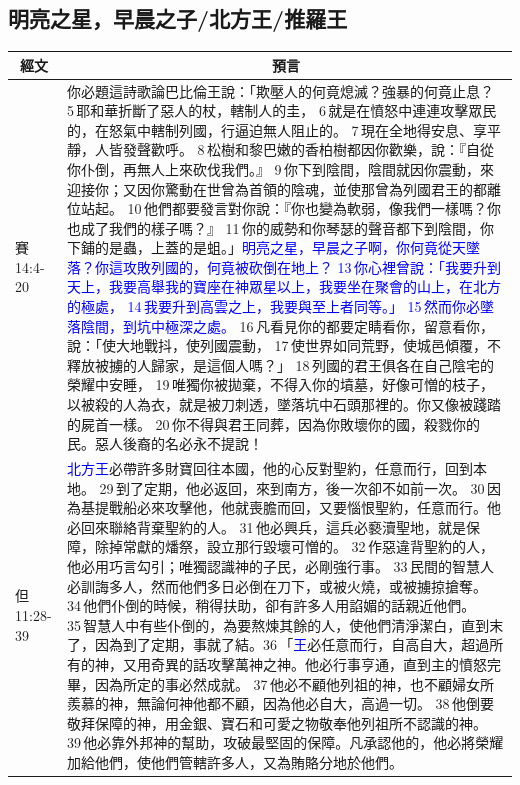 \subsection{明亮之星，早晨之子/北方王/推羅王}
\begin{table}[H]
\centering
\begin{tabular}{p{1.25cm}|p{16.25cm}}\hline\hline
\multicolumn{1}{c|}{經文}&\multicolumn{1}{c}{預言}\\\hline
賽14:4-20&你必題這詩歌論巴比倫王說：「欺壓人的何竟熄滅？強暴的何竟止息？ 5 耶和華折斷了惡人的杖，轄制人的圭， 6 就是在憤怒中連連攻擊眾民的，在怒氣中轄制列國，行逼迫無人阻止的。 7 現在全地得安息、享平靜，人皆發聲歡呼。 8 松樹和黎巴嫩的香柏樹都因你歡樂，說：『自從你仆倒，再無人上來砍伐我們。』 9 你下到陰間，陰間就因你震動，來迎接你；又因你驚動在世曾為首領的陰魂，並使那曾為列國君王的都離位站起。 10 他們都要發言對你說：『你也變為軟弱，像我們一樣嗎？你也成了我們的樣子嗎？』 11 你的威勢和你琴瑟的聲音都下到陰間，你下鋪的是蟲，上蓋的是蛆。」\textcolor{blue}{明亮之星，早晨之子啊，你何竟從天墜落？你這攻敗列國的，何竟被砍倒在地上？ 13 你心裡曾說：「我要升到天上，我要高舉我的寶座在神眾星以上，我要坐在聚會的山上，在北方的極處， 14 我要升到高雲之上，我要與至上者同等。」 15 然而你必墜落陰間，到坑中極深之處。} 16 凡看見你的都要定睛看你，留意看你，說：「使大地戰抖，使列國震動， 17 使世界如同荒野，使城邑傾覆，不釋放被擄的人歸家，是這個人嗎？」 18 列國的君王俱各在自己陰宅的榮耀中安睡， 19 唯獨你被拋棄，不得入你的墳墓，好像可憎的枝子，以被殺的人為衣，就是被刀刺透，墜落坑中石頭那裡的。你又像被踐踏的屍首一樣。 20 你不得與君王同葬，因為你敗壞你的國，殺戮你的民。惡人後裔的名必永不提說！\\\hline
  
但11:28-39&\textcolor{blue}{北方王}必帶許多財寶回往本國，他的心反對聖約，任意而行，回到本地。 29 到了定期，他必返回，來到南方，後一次卻不如前一次。 30 因為基提戰船必來攻擊他，他就喪膽而回，又要惱恨聖約，任意而行。他必回來聯絡背棄聖約的人。 31 他必興兵，這兵必褻瀆聖地，就是保障，除掉常獻的燔祭，設立那行毀壞可憎的。 32 作惡違背聖約的人，他必用巧言勾引；唯獨認識神的子民，必剛強行事。 33 民間的智慧人必訓誨多人，然而他們多日必倒在刀下，或被火燒，或被擄掠搶奪。 34 他們仆倒的時候，稍得扶助，卻有許多人用諂媚的話親近他們。 35 智慧人中有些仆倒的，為要熬煉其餘的人，使他們清淨潔白，直到末了，因為到了定期，事就了結。36 「\textcolor{blue}{王}必任意而行，自高自大，超過所有的神，又用奇異的話攻擊萬神之神。他必行事亨通，直到主的憤怒完畢，因為所定的事必然成就。 37 他必不顧他列祖的神，也不顧婦女所羨慕的神，無論何神他都不顧，因為他必自大，高過一切。 38 他倒要敬拜保障的神，用金銀、寶石和可愛之物敬奉他列祖所不認識的神。 39 他必靠外邦神的幫助，攻破最堅固的保障。凡承認他的，他必將榮耀加給他們，使他們管轄許多人，又為賄賂分地於他們。\\\hline


\end{tabular}
\end{table}
